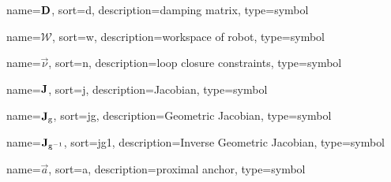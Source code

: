 	{%
		name=\ensuremath{\mat{D}},
		sort=d,
		description=damping matrix,
		type=symbol
	}
	\newcommand{\dampingmat}{\gls{sym:dampingmat}}

	{%
		name=\ensuremath{\mathcal{W}},
		sort=w,
		description=workspace of robot,
		type=symbol
	}
	\newcommand{\workspace}{\gls{sym:workspace}}

	{%
		name=\ensuremath{\vec{\nu}},
		sort=n,
		description=loop closure constraints,
		type=symbol
	}
	\newcommand{\loopclosureconstraints}{\gls{sym:loopclosureconstraints}}

	{%
		name=\ensuremath{\mat{J}},
		sort=j,
		description=Jacobian,
		type=symbol
	}
	\newcommand{\jac}{\gls{sym:jac}}

	{%
		name=\ensuremath{\mat{J}_{\func{g}}},
		sort=jg,
		description=Geometric Jacobian,
		type=symbol
	}
	\newcommand{\geometricjac}{\gls{sym:geometricjac}}

	{%
		name=\ensuremath{\mat{J}_{\func{g}^{-1}}},
		sort=jg1,
		description=Inverse Geometric Jacobian,
		type=symbol
	}
	\newcommand{\invgeometricjac}{\gls{sym:invgeometricjac}}

	{%
		name=\ensuremath{\vec{a}},
		sort=a,
		description=proximal anchor,
		type=symbol
	}
	\newcommand{\proximalanchor}{\gls{sym:proximalanchor}}

